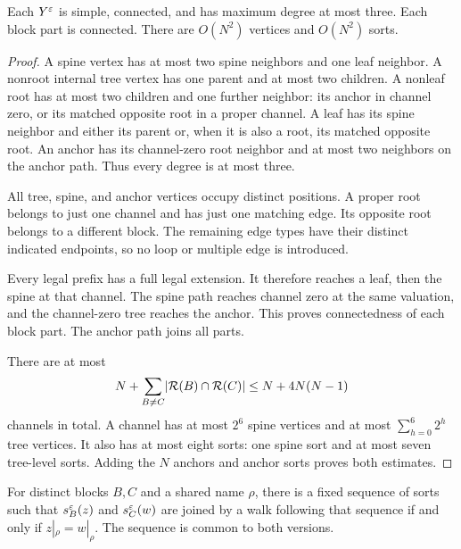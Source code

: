 \begin{lemma}
\label{graph:colored-promises}
Each \(Y^\varepsilon\) is simple, connected, and has maximum degree at most
three.  Each block part is connected.  There are \(O(N^2)\) vertices
and \(O(N^2)\) sorts.
\end{lemma}

\begin{proof}
A spine vertex has at most two spine neighbors and one leaf neighbor.
A nonroot internal tree vertex has one parent and at most two children.
A nonleaf root has at most two children and one further neighbor:
its anchor in channel zero, or its matched opposite root in a proper
channel.  A leaf has its spine neighbor and either its parent or,
when it is also a root, its matched opposite root.
An anchor has its channel-zero root neighbor and at most two neighbors
on the anchor path.
Thus every degree is at most three.

All tree, spine, and anchor vertices occupy distinct positions.
A proper root belongs to just one channel and has just one matching
edge.  Its opposite root belongs to a different block.
The remaining edge types have their distinct indicated endpoints,
so no loop or multiple edge is introduced.

Every legal prefix has a full legal extension.
It therefore reaches a leaf, then the spine at that channel.
The spine path reaches channel zero at the same valuation, and the
channel-zero tree reaches the anchor.
This proves connectedness of each block part.
The anchor path joins all parts.

There are at most
\[
 N+\sum_{B\ne C}\lvert\mathcal R(B)\cap\mathcal R(C)\rvert
 \le N+4N(N-1)
\]
channels in total.
A channel has at most \(2^6\) spine vertices and at most
\(\sum_{h=0}^6 2^h\) tree vertices.
It also has at most eight sorts: one spine sort and at most seven
tree-level sorts.  Adding the \(N\) anchors and anchor sorts proves
both estimates.
\end{proof}

\begin{lemma}
\label{graph:readout-walk}
For distinct blocks \(B,C\) and a shared name \(\rho\), there is a
fixed sequence of sorts such that
\(s_B^\varepsilon(z)\) and \(s_C^\varepsilon(w)\) are joined by a walk following
that sequence if and only if \(z|_\rho=w|_\rho\).
The sequence is common to both versions.
\end{lemma}

